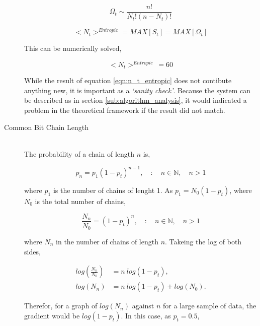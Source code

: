 \begin{description}
					\begin{equation}
						\Omega_t \sim \frac{n!}{N_{t}!(n-N_{t})!}
					\end{equation}

					\begin{equation}
						<N_t>^{Entropic} = MAX[S_t] = MAX[\Omega_t]
					\end{equation}

					This can be numerically solved,

					\begin{equation}
						<N_t>^{Entropic}\ = 60
						\label{eqn:n_t_entropic}
					\end{equation}

					While the result of equation \ref{eqn:n_t_entropic} does not contibute anything new, it is important as a \textit{`sanity check'}.
					Because the system can be described as in section \ref{sub:algorithm_analysis}, it would indicated a problem in the theoretical framework if the result did not match.


				\item[Common Bit Chain Length] \hfill \\
					
					The probability of a chain of length $n$ is,

					\begin{equation}
						p_n = p_1(1 - p_t)^{n-1}, \quad : \quad n \in \mathbb{N}, \quad n > 1
					\end{equation}

					where $p_1$ is the number of chains of lenght 1. 
					As $p_1 = N_0 (1 -p_t)$, where $N_0$ is the total number of chains,

					\begin{equation}
						\frac{N_n}{N_0} = (1 - p_t)^n, \quad : \quad n \in \mathbb{N}, \quad n > 1
					\end{equation}

					where $N_n$ in the number of chains of length $n$.
					Takeing the log of both sides,

					\begin{align}
						log\left(\frac{N_n}{N_0}\right) &= n\ log(1 - p_t), \nonumber \\
 						log(N_n) &= n\  log(1 - p_t) + log(N_0).
 					\end{align}

					Therefor, for a graph of $log(N_n)$ against $n$ for a large sample of data, the gradient would be $log(1 - p_t)$.
					In this case, as $p_t = 0.5$, 


\end{description}
